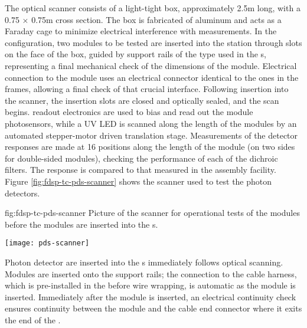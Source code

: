 The optical scanner consists of a light-tight box, approximately \num{2.5}m long, with a \num{0.75} $\times$ \num{0.75}m cross section. 
The box is fabricated of aluminum and acts as a Faraday cage to minimize electrical interference with measurements. 
In the  configuration, two  modules to be tested are inserted into the station through slots on the face of the box, guided by support rails of the type used in the s, representing a final mechanical check of the dimensions of the module.  
Electrical connection to the module uses an electrical connector identical to the ones in the  frames, allowing a final check of that crucial interface.
Following insertion into the scanner, the insertion slots are closed and optically sealed, and the scan begins. 
  readout electronics are used to bias and read out the module photosensors, while a UV LED is scanned along the length of the modules by an automated stepper-motor driven translation stage.  
Measurements of the detector responses are made at 16 positions along the length of the module (on two sides for double-sided  modules), checking the performance of each of the dichroic filters. 
The response is compared to that measured in the assembly facility. 
Figure \ref{fig:fdsp-tc-pds-scanner} shows the scanner used to test the  photon detectors.


\begin{dunefigure}{fig:fdsp-tc-pds-scanner}
{Picture of the scanner for operational tests of the  modules before the modules are inserted into the s.} 

\texttt{[image: pds-scanner]}
\end{dunefigure}

Photon detector are inserted into the s immediately follows optical scanning.  
Modules are inserted onto the  support rails; the connection to the cable harness, which is pre-installed in the  before wire wrapping, is automatic as the module is inserted.   
Immediately after the module is inserted, an electrical continuity check ensures continuity between the  module and the  cable end connector where it exits the end of the .



